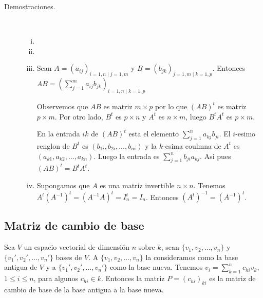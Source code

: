 \documentclass[12pt]{article}
\begin{document}
\begin{description}
\item [Demostraciones.] \mbox{}\\

\begin{enumerate}[i)]
\item
\item
\item Sean $A = (a_{ij})_{i = 1,n \mid j = 1,m}$ y $B = (b_{jk})_{j = 1,m \mid k = 1,p}$. Entonces $A B = (\sum\limits_{j=1}^{m} a_{ij} b_{jk})_{i = 1,n \mid k = 1,p}$

Observemos que $A B$ es matriz $m \times p$ por lo que $(A B)^t$ es matriz $p \times m$. Por otro lado, $B^t$ es $p \times n$ y $A^t$ es $n \times m$, luego $B^t A^t$ es $p \times m$.

En la entrada $ik$ de $(A B)^t$ esta el elemento $\sum\limits_{j=1}^{n} a_{kj} b_{ji}$. El $i$-esimo renglon de $B^t$ es $(b_{1i}, b_{2i}, \dots, b_{ni})$ y la $k$-esima coulmna de $A^t$ es $(a_{k1}, a_{k2}, \dots, a_{kn})$. Luego la entrada es $\sum\limits_{j=1}^{n} b_{ji} a_{kj}$. Asi pues $(A B)^t = B^t A^t$.

\item Supongamos que $A$ es una matriz invertible $n \times n$. Tenemos $A^t (A^{-1})^t = (A^{-1} A)^t = I_n^t = I_n$. Entonces $(A^t)^{-1} = (A^{-1})^t$.
\end{enumerate}

\end{description}

\subsection{Matriz de cambio de base}

Sea $V$ un espacio vectorial de dimensión $n$ sobre $k$, sean $\{ v_1, v_2, \dots, v_n \}$ y $\{ v_1', v_2', \dots, v_n' \}$ bases de $V$. A $\{ v_1, v_2, \dots, v_n \}$ la consideramos como la base antigua de $V$ y a $\{ v_1', v_2', \dots, v_n' \}$ como la base nueva. Tenemos $v_i = \sum\limits_{k=1}^{n} c_{hi} v_k$, $1\le i \le n$, para algunos $c_{hi} \in k$. Entonces la matriz $P = \left( c_{hi} \right)_{ki}$ es la matriz de cambio de base de la base antigua a la base nueva.
\end{document}
